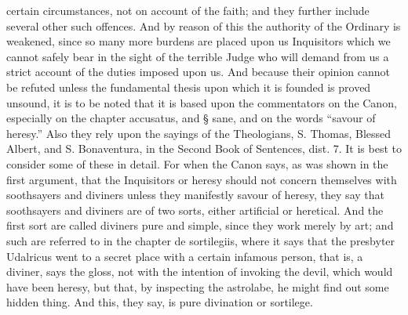        certain circumstances, not on account of the faith; and they further include several other
       such offences. And by reason of this the authority of the Ordinary is weakened, since so
       many more burdens are placed upon us Inquisitors which we cannot safely bear in the sight
       of the terrible Judge who will demand from us a strict account of the duties imposed upon
       us.
              And because their opinion cannot be refuted unless the fundamental thesis upon which
       it is founded is proved unsound, it is to be noted that it is based upon the commentators on
       the Canon, especially on the chapter accusatus, and § sane, and on the words “savour of
       heresy.” Also they rely upon the sayings of the Theologians, S. Thomas, Blessed Albert, and
       S. Bonaventura, in the Second Book of Sentences, dist. 7.
              It is best to consider some of these in detail. For when the Canon says, as was shown in
       the first argument, that the Inquisitors or heresy should not concern themselves with
       soothsayers and diviners unless they manifestly savour of heresy, they say that soothsayers
       and diviners are of two sorts, either artificial or heretical. And the first sort are called
       diviners pure and simple, since they work merely by art; and such are referred to in the
       chapter de sortilegiis, where it says that the presbyter Udalricus went to a secret place with a
       certain infamous person, that is, a diviner, says the gloss, not with the intention of invoking
       the devil, which would have been heresy, but that, by inspecting the astrolabe, he might find
       out some hidden thing. And this, they say, is pure divination or sortilege.



